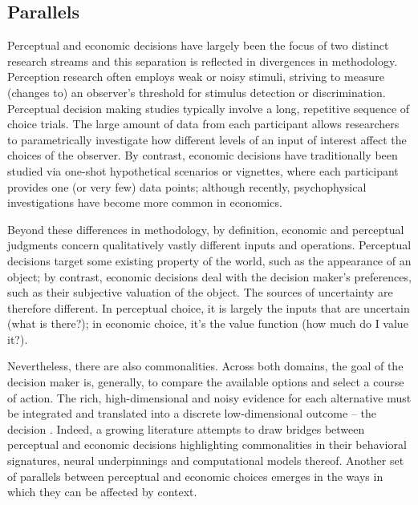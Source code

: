 \documentclass[a4paper, nobind]{templates/ociamthesis}
\begin{document}
\hypertarget{parallels}{%
\subsection{Parallels}\label{parallels}}

Perceptual and economic decisions have largely been the focus of two distinct research streams and this separation is reflected in divergences in methodology. Perception research often employs weak or noisy stimuli, striving to measure (changes to) an observer's threshold for stimulus detection or discrimination. Perceptual decision making studies typically involve a long, repetitive sequence of choice trials. The large amount of data from each participant allows researchers to parametrically investigate how different levels of an input of interest affect the choices of the observer. By contrast, economic decisions have traditionally been studied via one-shot hypothetical scenarios or vignettes, where each participant provides one (or very few) data points; although recently, psychophysical investigations have become more common in economics.

Beyond these differences in methodology, by definition, economic and perceptual judgments concern qualitatively vastly different inputs and operations. Perceptual decisions target some existing property of the world, such as the appearance of an object; by contrast, economic decisions deal with the decision maker's preferences, such as their subjective valuation of the object. The sources of uncertainty are therefore different. In perceptual choice, it is largely the inputs that are uncertain (what is there?); in economic choice, it's the value function (how much do I value it?).

Nevertheless, there are also commonalities. Across both domains, the goal of the decision maker is, generally, to compare the available options and select a course of action. The rich, high-dimensional and noisy evidence for each alternative must be integrated and translated into a discrete low-dimensional outcome -- the decision \autocite{summerfield2020}. Indeed, a growing literature attempts to draw bridges between perceptual and economic decisions \autocite{summerfield2012,woodford2020} highlighting commonalities in their behavioral signatures, neural underpinnings and computational models thereof. Another set of parallels between perceptual and economic choices emerges in the ways in which they can be affected by context.
\end{document}

